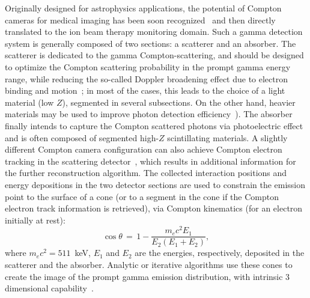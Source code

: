Originally designed for astrophysics applications, the potential of Compton cameras for medical imaging has been soon recognized~\parencite{Todd1974} and then directly translated to the ion beam therapy monitoring domain. Such a gamma detection system is generally  composed of two sections: a scatterer and an absorber. The scatterer is dedicated to the gamma Compton-scattering, and should be designed to optimize the Compton scattering probability in the prompt gamma energy range, while reducing the so-called Doppler broadening effect due to electron binding and motion~\parencite{Ordonez1997}; in most of the cases, this leads to the choice of a light material (low $Z$), segmented in several subsections. On the other hand, heavier materials may be used to improve photon detection efficiency~\parencite{Solevi2016, Aldawood2017, Polf2015}). The absorber finally intends to capture the Compton scattered photons via photoelectric effect and is often composed of segmented high-$Z$ scintillating materials. A slightly different Compton camera configuration can also achieve Compton electron tracking in the scattering detector~\parencite{Frandes2010, Yoshihara2017}, which results in additional information for the further reconstruction algorithm.
 The collected interaction positions and energy depositions in the two detector sections are used to constrain the emission point to the surface of a cone (or to a segment in the cone if the Compton electron track information is retrieved), via Compton kinematics (for an electron initially at rest):
\begin{equation}
\cos\theta\,=\,1-\frac{m_{e}c^{2}E_{1}}{E_{2}(E_{1}+E_{2})},
\label{chap4::eq::Compton_equation}
\end{equation} 
where \(m_{e}c^{2} = 511\)~keV, \(E_{1}\) and \(E_{2}\) are the energies, respectively, deposited in the scatterer and the absorber. 
Analytic or iterative algorithms use these cones to create the image of the prompt gamma emission distribution, with intrinsic 3 dimensional capability~\parencite{McKisson1994, Kuchment2016}. 

